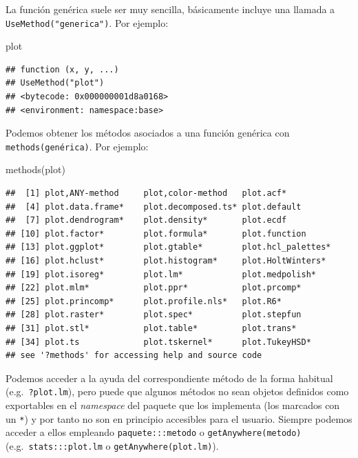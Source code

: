 \documentclass[
]{book}
\newenvironment{Shaded}{\begin{snugshade}}{\end{snugshade}}
\newcommand{\FunctionTok}[1]{\textcolor[rgb]{0.00,0.00,0.00}{#1}}
\newcommand{\NormalTok}[1]{#1}
\theoremstyle{break}
\theoremstyle{nonumberplain}
\begin{document}
La función genérica suele ser muy sencilla, básicamente incluye una llamada a \texttt{UseMethod("generica")}.
Por ejemplo:

\begin{Shaded}
\begin{Highlighting}[]
\NormalTok{plot}
\end{Highlighting}
\end{Shaded}

\begin{verbatim}
## function (x, y, ...) 
## UseMethod("plot")
## <bytecode: 0x000000001d8a0168>
## <environment: namespace:base>
\end{verbatim}

Podemos obtener los métodos asociados a una función genérica con \texttt{methods(genérica)}.
Por ejemplo:

\begin{Shaded}
\begin{Highlighting}[]
\FunctionTok{methods}\NormalTok{(plot)}
\end{Highlighting}
\end{Shaded}

\begin{verbatim}
##  [1] plot,ANY-method     plot,color-method   plot.acf*          
##  [4] plot.data.frame*    plot.decomposed.ts* plot.default       
##  [7] plot.dendrogram*    plot.density*       plot.ecdf          
## [10] plot.factor*        plot.formula*       plot.function      
## [13] plot.ggplot*        plot.gtable*        plot.hcl_palettes* 
## [16] plot.hclust*        plot.histogram*     plot.HoltWinters*  
## [19] plot.isoreg*        plot.lm*            plot.medpolish*    
## [22] plot.mlm*           plot.ppr*           plot.prcomp*       
## [25] plot.princomp*      plot.profile.nls*   plot.R6*           
## [28] plot.raster*        plot.spec*          plot.stepfun       
## [31] plot.stl*           plot.table*         plot.trans*        
## [34] plot.ts             plot.tskernel*      plot.TukeyHSD*     
## see '?methods' for accessing help and source code
\end{verbatim}

Podemos acceder a la ayuda del correspondiente método de la forma habitual (e.g.~\texttt{?plot.lm}), pero puede que algunos métodos no sean objetos definidos como exportables en el \emph{namespace} del paquete que los implementa (los marcados con un \texttt{*}) y por tanto no son en principio accesibles para el usuario.
Siempre podemos acceder a ellos empleando \texttt{paquete:::metodo} o \texttt{getAnywhere(metodo)} (e.g.~\texttt{stats:::plot.lm} o \texttt{getAnywhere(plot.lm)}).
\end{document}
